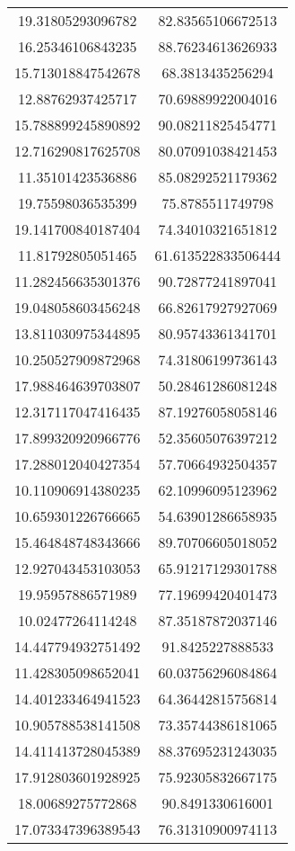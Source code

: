 \begin{table}
\begin{tabular}{cc}
19.31805293096782 & 82.83565106672513 \\
16.25346106843235 & 88.76234613626933 \\
15.713018847542678 & 68.3813435256294 \\
12.88762937425717 & 70.69889922004016 \\
15.788899245890892 & 90.08211825454771 \\
12.716290817625708 & 80.07091038421453 \\
11.35101423536886 & 85.08292521179362 \\
19.75598036535399 & 75.8785511749798 \\
19.141700840187404 & 74.34010321651812 \\
11.81792805051465 & 61.613522833506444 \\
11.282456635301376 & 90.72877241897041 \\
19.048058603456248 & 66.82617927927069 \\
13.811030975344895 & 80.95743361341701 \\
10.250527909872968 & 74.31806199736143 \\
17.988464639703807 & 50.28461286081248 \\
12.317117047416435 & 87.19276058058146 \\
17.899320920966776 & 52.35605076397212 \\
17.288012040427354 & 57.70664932504357 \\
10.110906914380235 & 62.10996095123962 \\
10.659301226766665 & 54.63901286658935 \\
15.464848748343666 & 89.70706605018052 \\
12.927043453103053 & 65.91217129301788 \\
19.95957886571989 & 77.19699420401473 \\
10.02477264114248 & 87.35187872037146 \\
14.447794932751492 & 91.8425227888533 \\
11.428305098652041 & 60.03756296084864 \\
14.401233464941523 & 64.36442815756814 \\
10.905788538141508 & 73.35744386181065 \\
14.411413728045389 & 88.37695231243035 \\
17.912803601928925 & 75.92305832667175 \\
18.00689275772868 & 90.8491330616001 \\
17.073347396389543 & 76.31310900974113 \\

\end{tabular}
\end{table}
